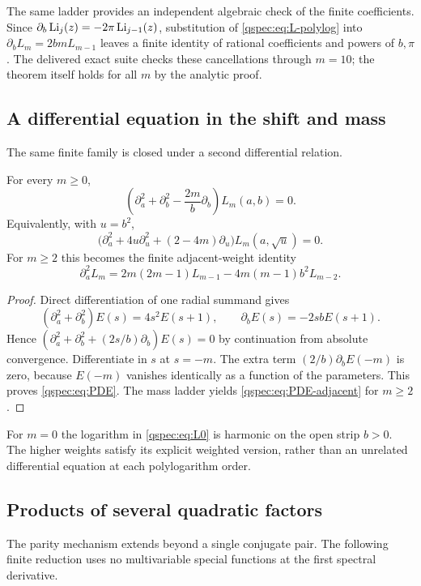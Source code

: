 The same ladder provides an independent algebraic check of the finite
coefficients. Since $\partial_b\operatorname{Li}_j(z)=-2\pi\operatorname{Li}_{j-1}(z)$,
substitution of \eqref{qspec:eq:L-polylog} into
$\partial_bL_m=2bmL_{m-1}$ leaves a finite identity of rational
coefficients and powers of $b,\pi$. The delivered exact suite checks
these cancellations through $m=10$; the theorem itself holds for all
$m$ by the analytic proof.

\subsection{A differential equation in the shift and mass}
The same finite family is closed under a second differential relation.
\begin{proposition}\label{qspec:prop:PDE}
For every $m\ge0$,
\begin{equation}\label{qspec:eq:PDE}
\left(\partial_a^2+\partial_b^2-\frac{2m}{b}\partial_b\right)L_m(a,b)=0.
\end{equation}
Equivalently, with $u=b^2$,
\[
\bigl(\partial_a^2+4u\partial_u^2+(2-4m)\partial_u\bigr)
L_m(a,\sqrt u)=0.
\]
For $m\ge2$ this becomes the finite adjacent-weight identity
\begin{equation}\label{qspec:eq:PDE-adjacent}
\partial_a^2L_m=2m(2m-1)L_{m-1}-4m(m-1)b^2L_{m-2}.
\end{equation}
\end{proposition}
\begin{proof}
Direct differentiation of one radial summand gives
\[
(\partial_a^2+\partial_b^2)E(s)=4s^2E(s+1),
\qquad \partial_bE(s)=-2sbE(s+1).
\]
Hence $(\partial_a^2+\partial_b^2+(2s/b)\partial_b)E(s)=0$
by continuation from absolute convergence. Differentiate in $s$ at
$s=-m$. The extra term $(2/b)\partial_bE(-m)$ is zero, because
$E(-m)$ vanishes identically as a function of the parameters. This
proves \eqref{qspec:eq:PDE}. The mass ladder yields
\eqref{qspec:eq:PDE-adjacent} for $m\ge2$.
\end{proof}
For $m=0$ the logarithm in \eqref{qspec:eq:L0} is harmonic on the open
strip $b>0$. The higher weights satisfy its explicit weighted version,
rather than an unrelated differential equation at each polylogarithm order.

\subsection{Products of several quadratic factors}
The parity mechanism extends beyond a single conjugate pair. The following
finite reduction uses no multivariable special functions at the first
spectral derivative.

